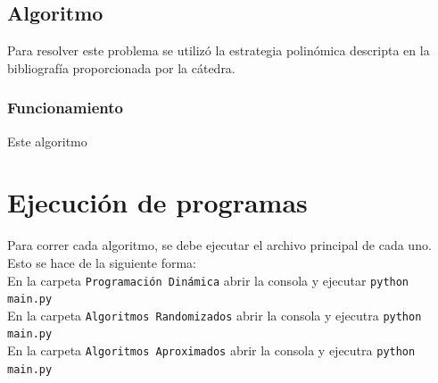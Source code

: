 \documentclass[a4paper, 10pt]{article}
\def\code#1{\texttt{#1}}
\newcommand\tab[1][0.5cm]{\hspace*{#1}}
\begin{document}
        \subsection{Algoritmo}
            \tab Para resolver este problema se utilizó la estrategia polinómica descripta en
            la bibliografía proporcionada por la cátedra.
            \subsubsection{Funcionamiento}
                \tab Este algoritmo %
    \newpage

    \section{Ejecución de programas}
    \tab Para correr cada algoritmo, se debe ejecutar el archivo principal de cada uno.
    Esto se hace de la siguiente forma: \\
    \tab\tab En la carpeta \code{Programación Dinámica} abrir la consola y ejecutar \code{python main.py} \\
    \tab\tab En la carpeta \code{Algoritmos Randomizados} abrir la consola y ejecutra \code{python main.py} \\
    \tab\tab En la carpeta \code{Algoritmos Aproximados} abrir la consola y ejecutra \code{python main.py} \\

\end{document}
